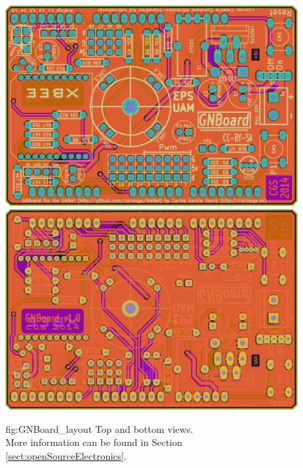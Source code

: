 \newpage
\begin{figure}[h!]
\centerline{\mbox{\includegraphics[width=13.5cm]{images/GNBoard_top.png}}}
\vspace{0.5cm}
\centerline{\mbox{\includegraphics[width=13.5cm]{images/GNBoard_btm.png}}}
\centering{}
{fig:GNBoard_layout}{
Top and bottom views.\\
More information can be found in Section \ref{sect:openSourceElectronics}.
}
\end{figure}





\newpage
\thispagestyle{empty}



